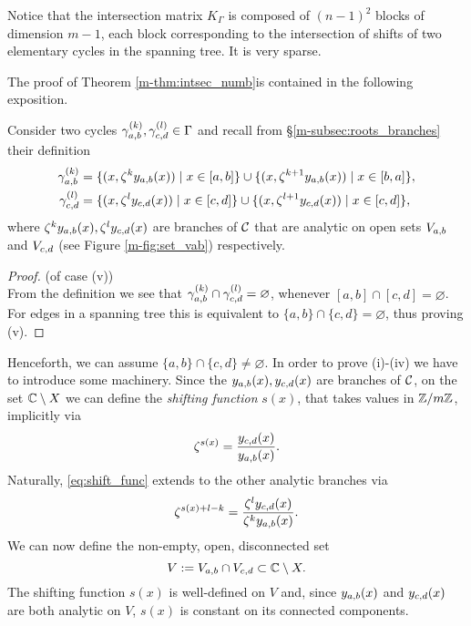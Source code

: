 \documentclass[main.tex]{subfiles}
\begin{document}
 \begin{rmk}
     Notice that the intersection matrix $K_{\Gamma}$ is composed of
  $(n-1)^2$ blocks of dimension $m-1$, each block corresponding to the intersection
  of shifts of two elementary cycles in the spanning tree. It is very sparse.
 \end{rmk}


 \bigskip
 The proof of Theorem \ref{m-thm:intsec_numb}is contained in the following exposition.
 \bigskip

  Consider
  two cycles $\gamma_{a,b}^{(k)},\gamma_{c,d}^{(l)} \in \Gamma$ and
  recall from \S \ref{m-subsec:roots_branches} their definition
   \begin{align*}
      \gamma_{a,b}^{(k)} & = \{  (x,\zeta^k y_{a,b}(x))  \mid  x \in [a,b]  \} \cup \{  (x,\zeta^{k+1} y_{a,b}(x))  \mid  x \in [b,a]  \}, \\
      \gamma_{c,d}^{(l)} & = \{  (x,\zeta^l y_{c,d}(x))  \mid  x \in [c,d]  \} \cup \{  (x,\zeta^{l+1} y_{c,d}(x))  \mid  x \in [c,d]  \},
   \end{align*}
  where $\zeta^ky_{a,b}(x),\zeta^ly_{c,d}(x)$ are branches of $\mathcal{C}$ that are analytic on open sets $V_{a,b}$ and $V_{c,d}$
  (see Figure \ref{m-fig:set_vab}) respectively.

  \begin{proof}\let\qed\relax (of case (v)) \\
  From the definition we see that $\gamma_{a,b}^{(k)} \cap \gamma_{c,d}^{(l)} = \varnothing$, whenever $[a,b] \cap [c,d] = \varnothing$. For edges in a spanning tree
  this is equivalent to $\{a,b\} \cap \{c,d\} = \varnothing$, thus
  proving (v).
  \end{proof}

   Henceforth, we can assume $\{a,b\} \cap \{c,d\} \ne \varnothing$. In order to prove (i)-(iv) we have to introduce some machinery. Since the $y_{a,b}(x),y_{c,d}(x)$ are branches of $\mathcal{C}$,
   on the set $\mathbb{C} \setminus X$
   we can define the \emph{shifting function}
   $s(x)$, that takes values in $\mathbb{Z}/m\mathbb{Z}$, implicitly via
  \begin{equation}\label{eq:shift_func}
   \zeta^{s(x)} = \frac{y_{c,d}(x)}{y_{a,b}(x)}.
   \end{equation}
  Naturally, \eqref{eq:shift_func} extends to the other analytic branches via
  \begin{equation*}
   \zeta^{s(x)+l-k} = \frac{\zeta^ly_{c,d}(x)}{\zeta^ky_{a,b}(x)}.
   \end{equation*}
   We can now define the non-empty, open, disconnected set
   \begin{equation*}
    V := V_{a,b} \cap V_{c,d} \subset \mathbb{C} \setminus X.
   \end{equation*}
 The shifting function $s(x)$ is well-defined on $V$ and, since $y_{a,b}(x)$ and $y_{c,d}(x)$ are
  both analytic on $V$, $s(x)$ is constant on its
  connected components.
\end{document}
